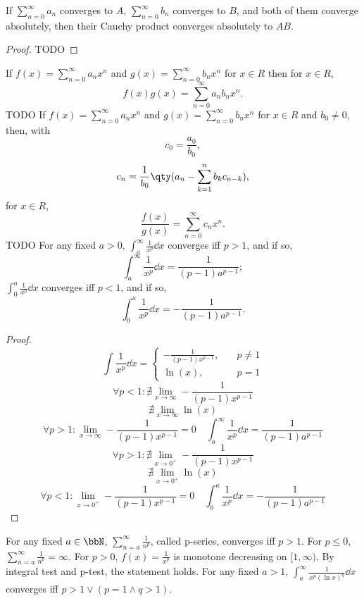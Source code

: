 If $\sum_{n=0}^{\infty}a_n$ converges to $A$, $\sum_{n=0}^{\infty}b_n$ converges to $B$, and both of them converge absolutely, then their Cauchy product converges absolutely to $AB$.
\begin{proof}
TODO
\end{proof}
If $f(x)=\sum_{n=0}^{\infty}a_nx^n$ and $g(x)=\sum_{n=0}^{\infty}b_nx^n$ for $x\in R$ then for $x\in R$,
\[f(x)g(x)=\sum_{n=0}^{\infty}a_nb_nx^n.\]
\bpr
TODO
\epr
{}
If $f(x)=\sum_{n=0}^{\infty}a_nx^n$ and $g(x)=\sum_{n=0}^{\infty}b_nx^n$ for $x\in R$ and $b_0\neq 0$, then, with
\[c_0=\frac{a_0}{b_0},\]
\[c_n=\frac{1}{b_0}\qty(a_n-\sum_{k=1}^nb_kc_{n-k}),\]
for $x\in R$,
\[\frac{f(x)}{g(x)}=\sum_{n=0}^{\infty}c_nx^n.\]
\bpr
TODO
\epr
{}
For any fixed $a>0$, $\int_a^{\infty}\frac{1}{x^p}\dd{x}$ converges iff $p>1$, and if so,
\[\int_a^{\infty}\frac{1}{x^p}\dd{x}=\frac{1}{(p-1)a^{p-1}};\]
$\int_0^a\frac{1}{x^p}\dd{x}$ converges iff $p<1$, and if so,
\[\int_0^a\frac{1}{x^p}\dd{x}=-\frac{1}{(p-1)a^{p-1}}.\]
\begin{proof}
\[\int\frac{1}{x^p}\dd{x}=\begin{cases}
-\frac{1}{(p-1)x^{p-1}},\quad&p\neq 1\\
\ln(x),\quad&p=1
\end{cases}\]
\[\forall p<1\colon\nexists\lim_{x\to\infty}-\frac{1}{(p-1)x^{p-1}}\]
\[\nexists\lim_{x\to\infty}\ln(x)\]
\[\forall p>1\colon\lim_{x\to\infty}-\frac{1}{(p-1)x^{p-1}}=0\quad\int_a^{\infty}\frac{1}{x^p}\dd{x}=\frac{1}{(p-1)a^{p-1}}\]
\[\forall p>1\colon\nexists\lim_{x\to 0^+}-\frac{1}{(p-1)x^{p-1}}\]
\[\nexists\lim_{x\to 0^+}\ln(x)\]
\[\forall p<1\colon\lim_{x\to 0^+}-\frac{1}{(p-1)x^{p-1}}=0\quad\int_0^a\frac{1}{x^p}\dd{x}=-\frac{1}{(p-1)a^{p-1}}\]
\end{proof}
For any fixed $a\in\bbN$, $\sum_{n=a}^{\infty}\frac{1}{n^p}$, called p-series, converges iff $p>1$.
\bpr
For $p\le0$, $\sum_{n=a}^{\infty}\frac{1}{n^p}=\infty$. For $p>0$, $f(x)=\frac{1}{x^p}$ is monotone decreasing on $[1,\infty)$. By integral test and p-test, the statement holds.
\epr
{}
For any fixed $a>1$, $\int_a^{\infty}\frac{1}{x^p(\ln x)^q}\dd{x}$ converges iff $p>1\lor(p=1\land q>1)$.

